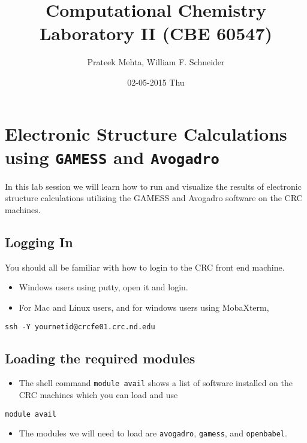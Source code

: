 \documentclass[11pt]{article}
\author{Prateek Mehta, William F. Schneider}
\date{02-05-2015 Thu}
\title{Computational Chemistry Laboratory II (CBE 60547)}
\begin{document}
\maketitle

\section{Electronic Structure Calculations using \texttt{GAMESS} and \texttt{Avogadro}}
\label{sec-1}

In this lab session we will learn how to run and visualize the results of electronic structure calculations utilizing the GAMESS and Avogadro software on the CRC machines.

\subsection{Logging In}
\label{sec-1-1}

You should all be familiar with how to login to the CRC front end machine.

\begin{itemize}
\item Windows users using putty, open it and login.

\item For Mac and Linux users, and for windows users using MobaXterm,
\end{itemize}

\begin{verbatim}
ssh -Y yournetid@crcfe01.crc.nd.edu
\end{verbatim}

\subsection{Loading the required modules}
\label{sec-1-2}

\begin{itemize}
\item The shell command \verb~module avail~ shows a list of software installed on the CRC machines which you can load and use
\end{itemize}

\begin{verbatim}
module avail
\end{verbatim}


\begin{itemize}
\item The modules we will need to load are \verb~avogadro~, \verb~gamess~, and \verb~openbabel~.
\end{itemize}
\end{document}
